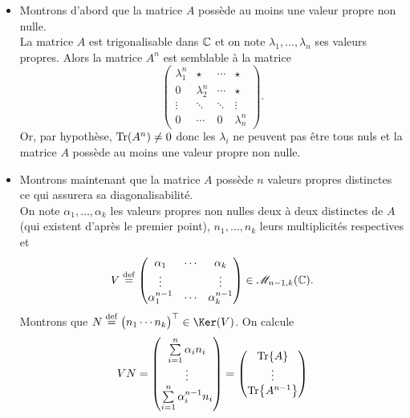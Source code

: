 \begin{demo}
    \begin{itemize}
        \item Montrons d'abord que la matrice $A$ possède au moins une valeur propre non nulle. \\
        La matrice $A$ est trigonalisable dans $\mathbb{C}$ et on note $\lambda_1, \dots, \lambda_n$ ses valeurs propres. Alors la matrice $A^n$ est semblable à la matrice
        $$
        \begin{pmatrix}
            \lambda_1^n & \star & \cdots & \star \\
            0 & \lambda_2^n & \cdots & \star \\
            \vdots & \ddots &\ddots & \vdots \\
            0 & \cdots & 0 & \lambda_n^n
        \end{pmatrix}.
        $$
        Or, par hypothèse, $\Tr(A^n) \not= 0$ donc les $\lambda_i$ ne peuvent pas être tous nuls et la matrice $A$ possède au moins une valeur propre non nulle.
        \item Montrons maintenant que la matrice $A$ possède $n$ valeurs propres distinctes ce qui assurera sa diagonalisabilité. \\
        On note $\alpha_1, \dots, \alpha_k$ les valeurs propres non nulles deux à deux distinctes de $A$ (qui existent d'après le premier point), $n_1, \dots, n_k$ leurs multiplicités respectives et 
        $$
        V \overset{\mathrm{\tiny def}}{=} \begin{pmatrix}
            \alpha_1 & \cdots & \alpha_k \\
            \vdots & & \vdots \\
            \alpha_1^{n-1} & \cdots & \alpha_k^{n-1}
        \end{pmatrix}
        \in \mathscr{M}_{n-1,k}(\mathbb{C}).
        $$
        Montrons que $N \defeq \Trsp{\begin{pmatrix} n_1  \cdots n_k \end{pmatrix}} \in \Ker(V)$. On calcule
        \begin{align*}
            V N = 
            \begin{pmatrix}
                \sum\limits_{i=1}^n \alpha_i n_i \\ 
                \vdots \\ 
                \sum\limits_{i=1}^n \alpha_i^{n-1} n_i
            \end{pmatrix}
            = 
            \begin{pmatrix}
                \Tr{A} \\ \vdots \\ \Tr{A^{n-1}}

\end{pmatrix}
\end{align*}
\end{itemize}
\end{demo}
